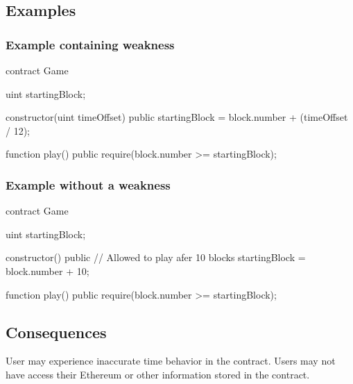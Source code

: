 \subsection{Examples}

\subsubsection{Example containing weakness}
\begin{solidity}
contract Game {
  uint startingBlock;

  constructor(uint timeOffset) public {
    startingBlock = block.number + (timeOffset / 12);
  }

  function play() public {
    require(block.number >= startingBlock);
  }
}
\end{solidity}

\subsubsection{Example without a weakness}
\begin{solidity}
contract Game {
  uint startingBlock;

  constructor() public {
    // Allowed to play afer 10 blocks
    startingBlock = block.number + 10;
  }

  function play() public {
    require(block.number >= startingBlock);
  }
}
\end{solidity}


\subsection{Consequences}
User may experience inaccurate time behavior in the contract. Users may not
have access their Ethereum or other information stored in the contract.
